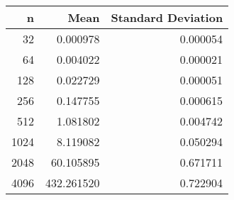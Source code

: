 \begin{tabular}{rrr}
\toprule
    n &        Mean &  Standard Deviation \\
\midrule
   32 &    0.000978 &            0.000054 \\
   64 &    0.004022 &            0.000021 \\
  128 &    0.022729 &            0.000051 \\
  256 &    0.147755 &            0.000615 \\
  512 &    1.081802 &            0.004742 \\
 1024 &    8.119082 &            0.050294 \\
 2048 &   60.105895 &            0.671711 \\
 4096 &  432.261520 &            0.722904 \\
\bottomrule
\end{tabular}
